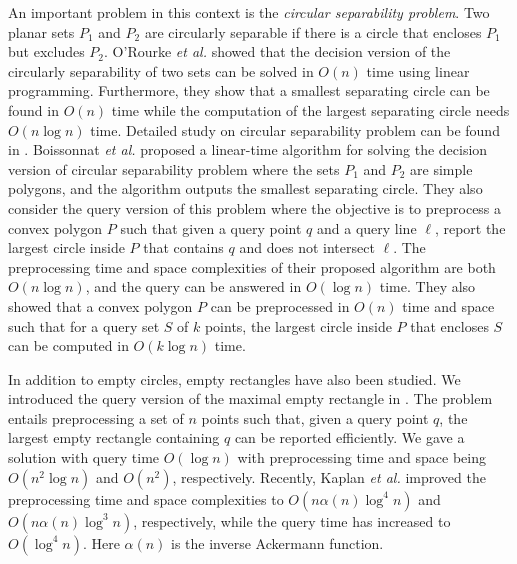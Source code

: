 \documentclass[12pt]{llncs}
\begin{document}
An important problem in this context is the {\it circular 
separability problem}. Two planar sets $P_1$ and $P_2$ are circularly 
separable if there is a circle that encloses $P_1$ but excludes $P_2$. 
O'Rourke {\it et al.} \cite{OKM86} showed that the decision version of the circularly 
separability of two sets can be solved in $O(n)$ time using linear 
programming. Furthermore, they show that a smallest separating circle can be found 
in $O(n)$ time while the computation of the largest separating circle needs 
$O(n \log n)$ time. Detailed study on circular separability problem can be 
found in \cite{BCDUY00,BCOY01,Fisk86,OKM86}. Boissonnat {\it et al.} \cite{BCOY01}
proposed a linear-time algorithm for solving the decision version of
circular separability problem where the sets $P_1$ and $P_2$ are simple
polygons, and the algorithm outputs the smallest separating circle. They also 
consider the query version of this problem where the objective is to
preprocess a convex polygon $P$ such that given a query point $q$ and a query
line $\ell$,  report the largest circle inside $P$ that contains $q$ and
does not intersect $\ell$. The preprocessing time and space
complexities of their proposed algorithm are both $O(n \log n)$, and the query
can be answered in $O(\log n)$ time. They also showed that a convex polygon
$P$ can be preprocessed in $O(n)$ time and space such that for a query set $S$
of $k$ points, the largest circle inside $P$ that encloses $S$ can be computed
in $O(k \log n)$ time.

In addition to empty circles, empty rectangles have also been studied. We introduced the query version of the maximal empty rectangle in \cite{ADMNRS10}. The problem entails preprocessing a set of $n$ points such that, given a query point $q$, the largest empty rectangle containing $q$ can be reported efficiently. We gave a solution with  query time  $O(\log n)$ with preprocessing time and space being $O(n^2 \log n)$ and $O(n^2)$, respectively.
Recently, Kaplan {\it et al.} \cite{KMNS12} improved the preprocessing time 
and space complexities  to $O(n\alpha(n)\log^4 n)$ and 
$O(n\alpha(n)\log^3 n)$, respectively, while the query time has increased to 
$O(\log ^4 n)$. Here $\alpha(n)$ is the inverse Ackermann function.
\end{document}

